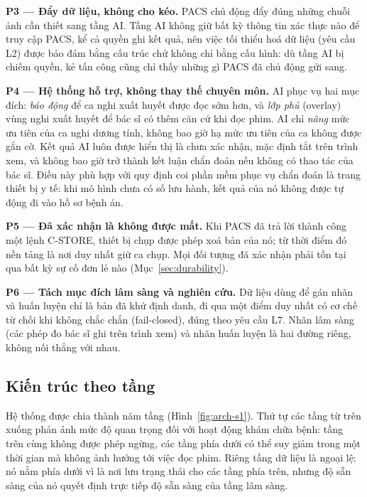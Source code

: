 \textbf{P3 --- Đẩy dữ liệu, không cho kéo.} PACS chủ động đẩy đúng những chuỗi ảnh
cần thiết sang tầng AI. Tầng AI không giữ bất kỳ thông tin xác thực nào để truy cập
PACS, kể cả quyền ghi kết quả, nên việc tối thiểu hoá dữ liệu (yêu cầu L2) được bảo
đảm bằng cấu trúc chứ không chỉ bằng cấu hình: dù tầng AI bị chiếm quyền, kẻ tấn công
cũng chỉ thấy những gì PACS đã chủ động gửi sang.

\textbf{P4 --- Hệ thống hỗ trợ, không thay thế chuyên môn.} AI phục vụ hai mục đích:
\emph{báo động} để ca nghi xuất huyết được đọc sớm hơn, và \emph{lớp phủ} (overlay)
vùng nghi xuất huyết để bác sĩ có thêm căn cứ khi đọc phim. AI chỉ \emph{nâng} mức ưu
tiên của ca nghi dương tính, không bao giờ hạ mức ưu tiên của ca không được gắn cờ.
Kết quả AI luôn được hiển thị là chưa xác nhận, mặc định tắt trên trình xem, và không
bao giờ trở thành kết luận chẩn đoán nếu không có thao tác của bác sĩ. Điều này phù
hợp với quy định coi phần mềm phục vụ chẩn đoán là trang thiết bị y tế: khi mô hình
chưa có số lưu hành, kết quả của nó không được tự động đi vào hồ sơ bệnh án.

\textbf{P5 --- Đã xác nhận là không được mất.} Khi PACS đã trả lời thành công một
lệnh C-STORE, thiết bị chụp được phép xoá bản của nó; từ thời điểm đó nền tảng là nơi
duy nhất giữ ca chụp. Mọi đối tượng đã xác nhận phải tồn tại qua bất kỳ sự cố đơn lẻ
nào (Mục~\ref{sec:durability}).

\textbf{P6 --- Tách mục đích lâm sàng và nghiên cứu.} Dữ liệu dùng để gán nhãn và
huấn luyện chỉ là bản đã khử định danh, đi qua một điểm duy nhất có cơ chế từ chối
khi không chắc chắn (fail-closed), đúng theo yêu cầu L7. Nhãn lâm sàng (các phép đo
bác sĩ ghi trên trình xem) và nhãn huấn luyện là hai đường riêng, không nối thẳng với
nhau.

\subsection{Kiến trúc theo tầng}
\label{sec:layers}

Hệ thống được chia thành năm tầng (Hình~\ref{fig:arch-s1}). Thứ tự các tầng từ trên
xuống phản ánh mức độ quan trọng đối với hoạt động khám chữa bệnh: tầng trên cùng
không được phép ngừng, các tầng phía dưới có thể suy giảm trong một thời gian mà không
ảnh hưởng tới việc đọc phim. Riêng tầng dữ liệu là ngoại lệ: nó nằm phía dưới vì là
nơi lưu trạng thái cho các tầng phía trên, nhưng độ sẵn sàng của nó quyết định trực
tiếp độ sẵn sàng của tầng lâm sàng.

